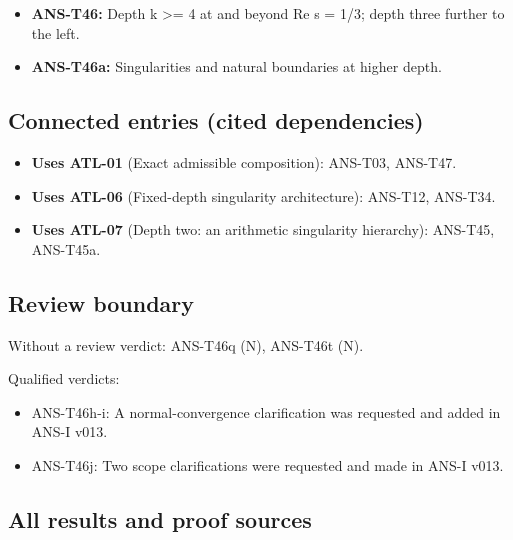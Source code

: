 \documentclass[
  11pt,
]{article}
\providecommand{\tightlist}{%
  \setlength{\itemsep}{0pt}\setlength{\parskip}{0pt}}
\begin{document}
\begin{itemize}
\tightlist
\item
  \textbf{ANS-T46:} Depth k \textgreater= 4 at and beyond Re s = 1/3;
  depth three further to the left.
\item
  \textbf{ANS-T46a:} Singularities and natural boundaries at higher
  depth.
\end{itemize}

\hypertarget{connected-entries-cited-dependencies-7}{%
\subsection{Connected entries (cited
dependencies)}\label{connected-entries-cited-dependencies-7}}

\begin{itemize}
\tightlist
\item
  \textbf{Uses ATL-01} (Exact admissible composition): ANS-T03, ANS-T47.
\item
  \textbf{Uses ATL-06} (Fixed-depth singularity architecture): ANS-T12,
  ANS-T34.
\item
  \textbf{Uses ATL-07} (Depth two: an arithmetic singularity hierarchy):
  ANS-T45, ANS-T45a.
\end{itemize}

\hypertarget{review-boundary-7}{%
\subsection{Review boundary}\label{review-boundary-7}}

Without a review verdict: ANS-T46q (N), ANS-T46t (N).

Qualified verdicts:

\begin{itemize}
\tightlist
\item
  ANS-T46h-i: A normal-convergence clarification was requested and added
  in ANS-I v013.
\item
  ANS-T46j: Two scope clarifications were requested and made in ANS-I
  v013.
\end{itemize}

\hypertarget{all-results-and-proof-sources-7}{%
\subsection{All results and proof
sources}\label{all-results-and-proof-sources-7}}
\end{document}
